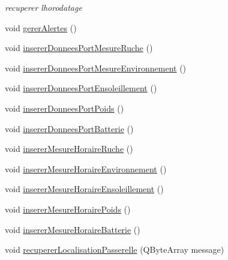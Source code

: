 \begin{DoxyCompactItemize}
\begin{DoxyCompactList}\small\item\em recuperer l\textquotesingle{}horodatage \end{DoxyCompactList}\item 
void \hyperlink{class_ruche_a80f3538f081aea887d7199f114dfca01}{gerer\+Alertes} ()
\item 
void \hyperlink{class_ruche_aa61f6dd8b15e5242ef3a3bdd87cca4a3}{inserer\+Donnees\+Port\+Mesure\+Ruche} ()
\item 
void \hyperlink{class_ruche_a46c0f440f40a5125f2d579b481660457}{inserer\+Donnees\+Port\+Mesure\+Environnement} ()
\item 
void \hyperlink{class_ruche_ad21de5f7d48195be0658f52c55f34183}{inserer\+Donnees\+Port\+Ensoleillement} ()
\item 
void \hyperlink{class_ruche_a923f42fc4878a01f6102966a748e8f37}{inserer\+Donnees\+Port\+Poids} ()
\item 
void \hyperlink{class_ruche_a509367d6b2bcb7e6431fc1cc5ff606b5}{inserer\+Donnees\+Port\+Batterie} ()
\item 
void \hyperlink{class_ruche_a3a093c088d9c97f347394c8a681f7302}{inserer\+Mesure\+Horaire\+Ruche} ()
\item 
void \hyperlink{class_ruche_ac52e79446c5629645e02e27d2a01e56c}{inserer\+Mesure\+Horaire\+Environnement} ()
\item 
void \hyperlink{class_ruche_a658234b9d96541d204b95b74556742b6}{inserer\+Mesure\+Horaire\+Ensoleillement} ()
\item 
void \hyperlink{class_ruche_a01759e2b2d37ddf0a91b50182c5f26f2}{inserer\+Mesure\+Horaire\+Poids} ()
\item 
void \hyperlink{class_ruche_a4af7e7c209b2267daf1f640cb53020e2}{inserer\+Mesure\+Horaire\+Batterie} ()
\item 
void \hyperlink{class_ruche_abdb0503e660631a0a9d2ed7177918341}{recuperer\+Localisation\+Passerelle} (Q\+Byte\+Array message)
\end{DoxyCompactItemize}

